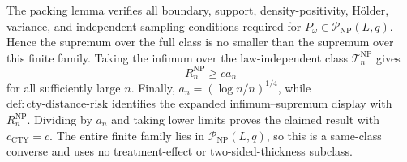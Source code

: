 The packing lemma verifies all boundary, support, density-positivity, H\"older, variance, and independent-sampling conditions required for \(P_\omega\in\mathcal P_{\mathrm{NP}}(L,q)\).  Hence the supremum over the full class is no smaller than the supremum over this finite family.  Taking the infimum over the law-independent class \(\mathcal T_n^{\mathrm{NP}}\) gives
\[
 R_n^{\mathrm{NP}}\geq c a_n
\]
for all sufficiently large \(n\).  Finally, \(a_n=(\log n/n)^{1/4}\), while \(\mathrm{def:cty\text{-}distance\text{-}risk}\) identifies the expanded infimum--supremum display with \(R_n^{\mathrm{NP}}\).  Dividing by \(a_n\) and taking lower limits proves the claimed result with \(c_{\mathrm{CTY}}=c\).  The entire finite family lies in \(\mathcal P_{\mathrm{NP}}(L,q)\), so this is a same-class converse and uses no treatment-effect or two-sided-thickness subclass.